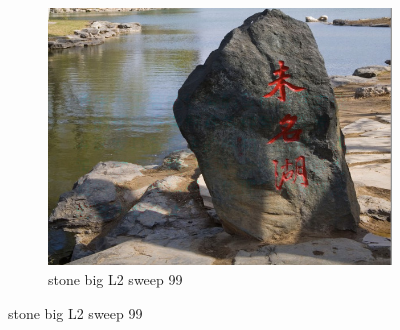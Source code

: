 \documentclass[11pt]{article}
\begin{document}
\begin{figure}[ht!]
\begin{subfigure}[]{0.333\linewidth}
        \centering
        \includegraphics[width=\linewidth]{fig/restoration/stone_big/L2/gibbs_99.jpg}
        \caption{stone big L2 sweep 99}
    \end{subfigure}%
\end{figure}
\end{document}
